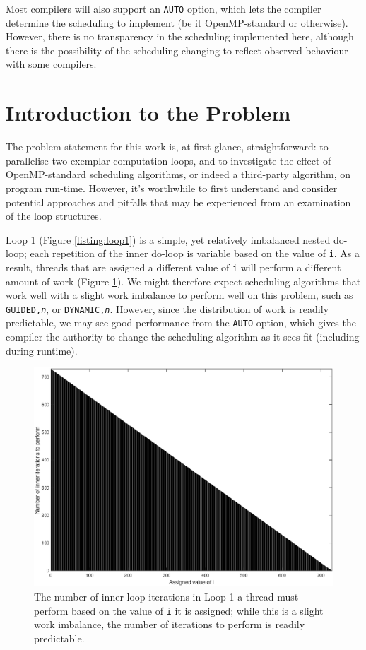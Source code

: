 \documentclass{article} %
\newcommand{\tp}{\texttt}
\begin{document}
Most compilers will also support an \tp{AUTO} option, which lets the compiler determine the scheduling to implement (be it OpenMP-standard or otherwise).
However, there is no transparency in the scheduling implemented here, although there is the possibility of the scheduling changing to reflect observed behaviour with some compilers.

\section*{Introduction to the Problem}

The problem statement for this work is, at first glance, straightforward: to parallelise two exemplar computation loops, and to investigate the effect of OpenMP-standard scheduling algorithms, or indeed a third-party algorithm, on program run-time.
However, it's worthwhile to first understand and consider potential approaches and pitfalls that may be experienced from an examination of the loop structures.

Loop 1 (Figure \ref{listing:loop1}) is a simple, yet relatively imbalanced nested do-loop; each repetition of the inner do-loop is variable based on the value of \texttt{i}.
As a result, threads that are assigned a different value of \tp{i} will perform a different amount of work (Figure \ref{fig:loop1work}).
We might therefore expect scheduling algorithms that work well with a slight work imbalance to perform well on this problem, such as \tp{GUIDED,\textit{n}}, or \tp{DYNAMIC,\textit{n}}. 
However, since the distribution of work is readily predictable, we may see good performance from the \tp{AUTO} option, which gives the compiler the authority to change the scheduling algorithm as it sees fit (including during runtime).

\begin{figure}
    \centering
    \includegraphics[height=.3\textheight]{part1_plots/loop1_balancing.eps}
    \caption{The number of inner-loop iterations in Loop 1 a thread must perform based on the value of \tp{i} it is assigned; while this is a slight work imbalance, the number of iterations to perform is readily predictable.}
    \label{fig:loop1work}
\end{figure}
    
\end{document}
